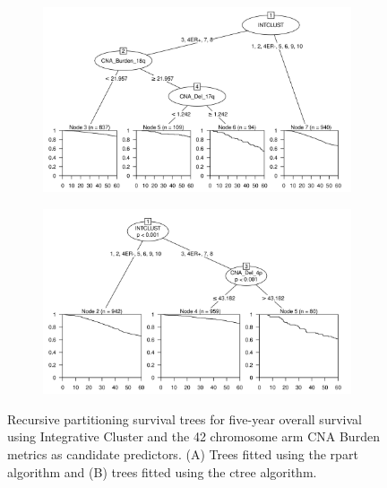 \begin{figure}[!htb]
\centering

\vspace{0.5cm}

\begin{subfigure}{\textwidth}
\subcaption{}
\includegraphics[width=1\textwidth]{../figures/Appendices/Appendix_B/PA_PartyKit_Survival_Burden_FiveYearOS_INTCLUST.png}
\end{subfigure}

\vspace{2cm}

\begin{subfigure}{\textwidth}
\subcaption{}
\includegraphics[width=1\textwidth]{../figures/Appendices/Appendix_B/PA_Ctree_Survival_Burden_FiveYearOS_INTCLUST.png}
\end{subfigure}

\vspace{0.5cm}

\caption[Recursive partitioning survival trees for five-year overall survival using Integrative Cluster and the 42 chromosome arm CNA Burden metrics as candidate predictors.]{Recursive partitioning survival trees for five-year overall survival using Integrative Cluster and the 42 chromosome arm CNA Burden metrics as candidate predictors. (A) Trees fitted using the rpart algorithm and (B) trees fitted using the ctree algorithm.}
\end{figure}

